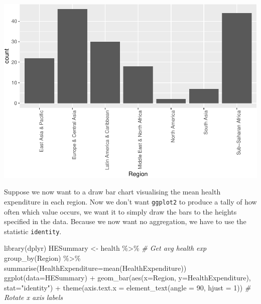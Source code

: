 \documentclass[
]{book}
\newenvironment{Shaded}{\begin{snugshade}}{\end{snugshade}}
\newcommand{\AttributeTok}[1]{\textcolor[rgb]{0.77,0.63,0.00}{#1}}
\newcommand{\CommentTok}[1]{\textcolor[rgb]{0.56,0.35,0.01}{\textit{#1}}}
\newcommand{\DecValTok}[1]{\textcolor[rgb]{0.00,0.00,0.81}{#1}}
\newcommand{\FunctionTok}[1]{\textcolor[rgb]{0.00,0.00,0.00}{#1}}
\newcommand{\NormalTok}[1]{#1}
\newcommand{\OtherTok}[1]{\textcolor[rgb]{0.56,0.35,0.01}{#1}}
\newcommand{\SpecialCharTok}[1]{\textcolor[rgb]{0.00,0.00,0.00}{#1}}
\newcommand{\StringTok}[1]{\textcolor[rgb]{0.31,0.60,0.02}{#1}}
\begin{document}
\includegraphics{bookdown-demo_files/figure-latex/unnamed-chunk-62-1.pdf}

Suppose we now want to a draw bar chart visualising the mean health expenditure in each region. Now we don't want \texttt{ggplot2} to produce a tally of how often which value occurs, we want it to simply draw the bars to the heights specified in the data. Because we now want no aggregation, we have to use the statistic \texttt{identity}.

\begin{Shaded}
\begin{Highlighting}[]
\FunctionTok{library}\NormalTok{(dplyr)}
\NormalTok{HESummary }\OtherTok{\textless{}{-}}\NormalTok{ health }\SpecialCharTok{\%\textgreater{}\%}                                      \CommentTok{\# Get avg health exp}
                 \FunctionTok{group\_by}\NormalTok{(Region) }\SpecialCharTok{\%\textgreater{}\%} 
                 \FunctionTok{summarise}\NormalTok{(}\AttributeTok{HealthExpenditure=}\FunctionTok{mean}\NormalTok{(HealthExpenditure))}
\FunctionTok{ggplot}\NormalTok{(}\AttributeTok{data=}\NormalTok{HESummary) }\SpecialCharTok{+}
    \FunctionTok{geom\_bar}\NormalTok{(}\FunctionTok{aes}\NormalTok{(}\AttributeTok{x=}\NormalTok{Region, }\AttributeTok{y=}\NormalTok{HealthExpenditure), }\AttributeTok{stat=}\StringTok{"identity"}\NormalTok{) }\SpecialCharTok{+}
    \FunctionTok{theme}\NormalTok{(}\AttributeTok{axis.text.x =} \FunctionTok{element\_text}\NormalTok{(}\AttributeTok{angle =} \DecValTok{90}\NormalTok{, }\AttributeTok{hjust =} \DecValTok{1}\NormalTok{)) }\CommentTok{\# Rotate x axis labels}
\end{Highlighting}
\end{Shaded}
\end{document}
